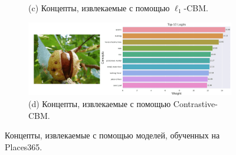 \begin{figure}[h]
\begin{subfigure}
    \\
    (c) Концепты, извлекаемые с помощью $\ell_1$-CBM.
    \end{subfigure}
        \begin{subfigure}%
     \centering
  \includegraphics[width=0.75\linewidth]{./figures/contr_im_5-compressed.png}
    \\
    (d) Концепты, извлекаемые с помощью Contrastive-CBM.
    \end{subfigure}
    \caption{Концепты, извлекаемые с помощью моделей, обученных на Places365.}
    \label{fig:concepts_5}
\end{figure}

